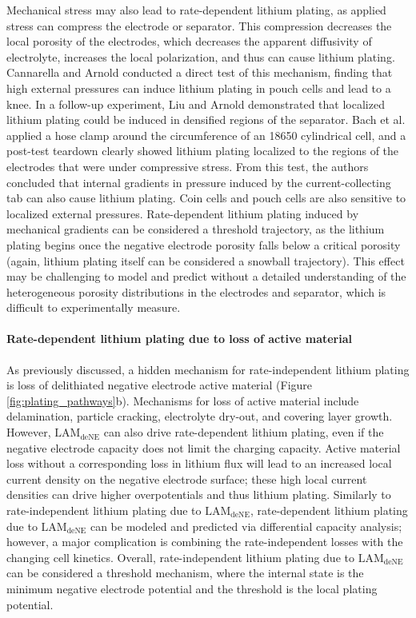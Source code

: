 \documentclass[journal=jpclcd,manuscript=article]{achemso}
\begin{document}
Mechanical stress may also lead to rate-dependent lithium plating, as applied stress can compress the electrode or separator. This compression decreases the local porosity of the electrodes, which decreases the apparent diffusivity of electrolyte, increases the local polarization, and thus can cause lithium plating. Cannarella and Arnold\cite{cannarella_stress_2014} conducted a direct test of this mechanism, finding that high external pressures can induce lithium plating in pouch cells and lead to a knee. In a follow-up experiment, Liu and Arnold\cite{liu_effects_2020} demonstrated that localized lithium plating could be induced in densified regions of the separator. Bach et al.\cite{bach_nonlinear_2016} applied a hose clamp around the circumference of an 18650 cylindrical cell, and a post-test teardown clearly showed lithium plating localized to the regions of the electrodes that were under compressive stress. From this test, the authors concluded that internal gradients in pressure induced by the current-collecting tab can also cause lithium plating. Coin cells and pouch cells are also sensitive to localized external pressures.\cite{liu_size_2018, fuchs_post-mortem_2019, okasinski_situ_2020}
Rate-dependent lithium plating induced by mechanical gradients can be considered a threshold trajectory, as the lithium plating begins once the negative electrode porosity falls below a critical porosity (again, lithium plating itself can be considered a snowball trajectory).
This effect may be challenging to model and predict without a detailed understanding of the heterogeneous porosity distributions in the electrodes and separator, which is difficult to experimentally measure.

\paragraph{Rate-dependent lithium plating due to loss of active material}
As previously discussed, a hidden mechanism for rate-independent lithium plating is loss of delithiated negative electrode active material (Figure \ref{fig:plating_pathways}b).\cite{ansean_operando_2017, dubarry_durability_2018, baure_synthetic_2019, dubarry_big_2020} Mechanisms for loss of active material include delamination, particle cracking, electrolyte dry-out, and covering layer growth. However, $\mathrm{LAM_{deNE}}$ can also drive rate-dependent lithium plating, even if the negative electrode capacity does not limit the charging capacity. Active material loss without a corresponding loss in lithium flux will lead to an increased local current density on the negative electrode surface; these high local current densities can drive higher overpotentials and thus lithium plating.
Similarly to rate-independent lithium plating due to $\mathrm{LAM_{deNE}}$, rate-dependent lithium plating due to $\mathrm{LAM_{deNE}}$ can be modeled and predicted via differential capacity analysis; however, a major complication is combining the rate-independent losses with the changing cell kinetics.
Overall, rate-independent lithium plating due to $\mathrm{LAM_{deNE}}$ can be considered a threshold mechanism, where the internal state is the minimum negative electrode potential and the threshold is the local plating potential.
\end{document}
